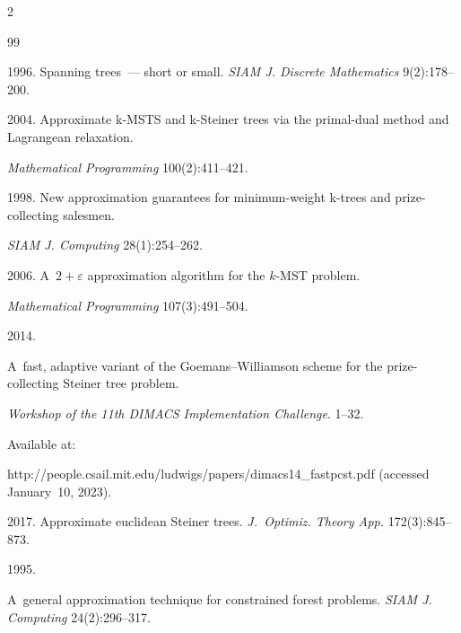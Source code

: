 \begin{multicols}{2}
{{\begin{thebibliography}{99}


 1996. Spanning trees~--- short or small. \textit{SIAM J. Discrete Mathematics} 9(2):178--200.





 2004. Approximate k-MSTS and k-Steiner trees via the primal-dual method and Lagrangean relaxation. 

 \textit{Mathematical Programming} 100(2):411--421.





 1998. New approximation guarantees for minimum-weight k-trees and prize-collecting salesmen.

 \textit{SIAM J. Computing} 28(1):254--262.




 2006. A~$2+\varepsilon$ approximation algorithm for the $k$-MST problem. 

\textit{Mathematical Programming} 107(3):491--504.




 2014. 

A~fast, adaptive variant of the Goemans--Williamson scheme for the prize-collecting Steiner tree problem. 

\textit{Workshop of the 11th DIMACS Implementation Challenge}. 1--32.

Available at: 

{\sf http://people.csail.mit.edu/ludwigs/papers/\linebreak dimacs14\_fastpcst.pdf} (accessed January~10, 2023).





2017. Approximate euclidean Steiner trees. \textit{J.~Optimiz. Theory  App.} 172(3):845--873.




 1995. 

A~general approximation technique for constrained forest problems. \textit{SIAM J. Computing} 24(2):296--317.

 \end{thebibliography}



 }

 }



\end{multicols}



